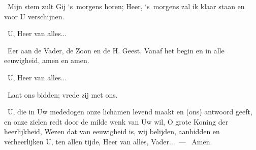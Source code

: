 \documentclass[12pt,twoside,a5paper]{article}
\begin{document}
\begin{halfparskip}
  \dd~Mijn stem zult Gij `s~morgens horen; Heer, `s~morgens zal ik klaar staan en voor U verschijnen.

  \rr~U, Heer van alles...

  \dd~Eer aan de Vader, de Zoon en de H. Geest. Vanaf het begin en in alle eeuwigheid, amen en amen.

  \rr~U, Heer van alles...

  \dd~Laat ons bidden; vrede zij met ons.

  \cc~U, die in Uw mededogen onze lichamen levend maakt en (ons) antwoord geeft, en onze zielen redt door de milde wenk van Uw wil, O grote Koning der heerlijkheid, Wezen dat van eeuwigheid is, wij belijden, aanbidden en verheerlijken U, ten allen tijde, Heer van alles, Vader...~--- \rr~Amen.
\end{halfparskip}
\end{document}
